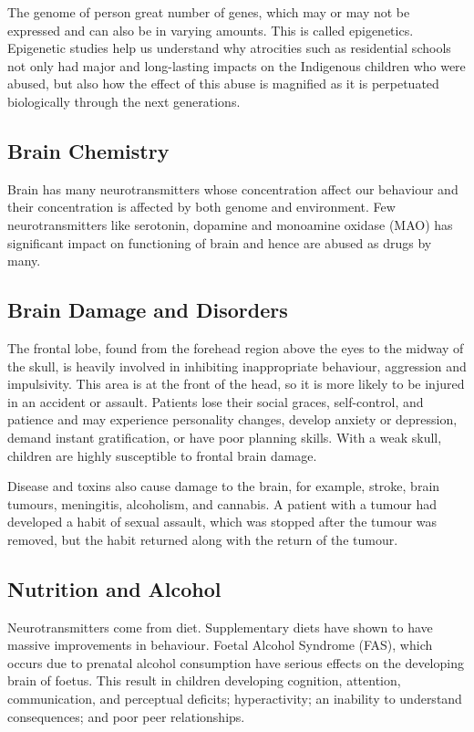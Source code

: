 \documentclass{article}
\begin{document}
The genome of person great number of genes, which may or may not be expressed and can also be in varying amounts. This is called epigenetics. Epigenetic studies help us understand why atrocities such as residential schools not only had major and long-lasting impacts on the Indigenous children who were abused, but also how the effect of this abuse is magnified as it is perpetuated biologically through the next generations.

\subsection{Brain Chemistry}

Brain has many neurotransmitters whose concentration affect our  behaviour and their concentration is affected by both genome and environment. Few neurotransmitters like serotonin, dopamine and monoamine oxidase (MAO) has significant impact on functioning of brain and hence are abused as drugs by many.

\subsection{Brain Damage and Disorders}
The frontal lobe, found from the forehead region above the eyes to the midway of the skull, is heavily involved in inhibiting inappropriate behaviour, aggression and impulsivity. This area is at the front of the head, so it is more likely to be injured in an accident or assault. Patients lose their social graces, self-control, and patience and may experience personality changes, develop anxiety or depression, demand instant gratification, or have poor planning skills. With a weak skull, children are highly susceptible to frontal brain damage.

Disease and toxins also cause damage to the brain, for example, stroke, brain tumours, meningitis, alcoholism, and cannabis. A patient with a tumour had developed a habit of sexual assault, which was stopped after the tumour was removed, but the habit returned along with the return of the tumour.

\subsection{Nutrition and Alcohol}

Neurotransmitters come from diet. Supplementary diets have shown to have massive improvements in behaviour. Foetal Alcohol Syndrome (FAS), which occurs due to prenatal alcohol consumption have serious effects on the developing brain of foetus. This result in children developing cognition, attention, communication, and perceptual deficits; hyperactivity; an inability to understand consequences; and poor peer relationships.
\end{document}
